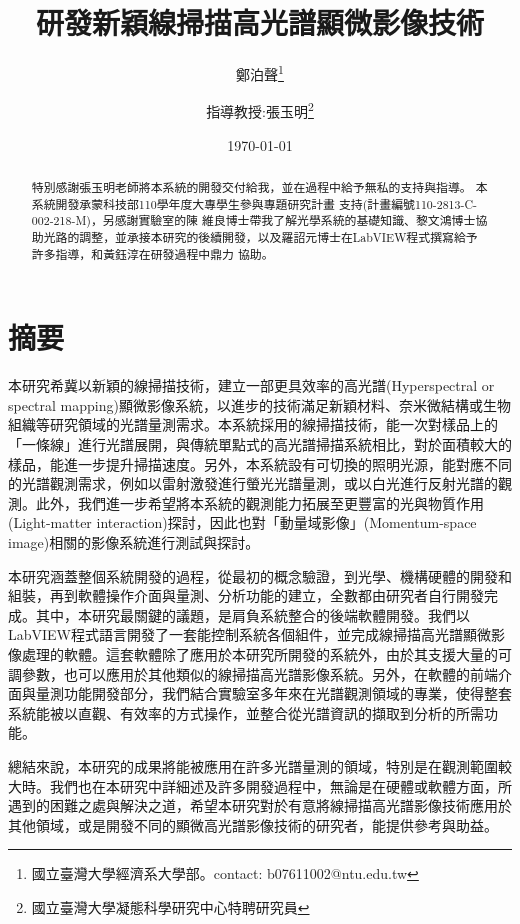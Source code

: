 \documentclass[12pt]{article}
\title{研發新穎線掃描高光譜顯微影像技術}
\author{鄭泊聲\thanks{國立臺灣大學經濟系大學部。contact: b07611002@ntu.edu.tw}
\and 指導教授:張玉明\thanks{國立臺灣大學凝態科學研究中心特聘研究員}}
\date{\today}
\begin{document}
\maketitle
{}
\begin{abstract}
    特別感謝張玉明老師將本系統的開發交付給我，並在過程中給予無私的支持與指導。
本系統開發承蒙科技部110學年度大專學生參與專題研究計畫
支持(計畫編號110-2813-C-002-218-M)，另感謝實驗室的陳
維良博士帶我了解光學系統的基礎知識、黎文鴻博士協助光路的調整，並承接本研究的後續開發，以及羅詔元博士在LabVIEW程式撰寫給予許多指導，和黃鈺淳在研發過程中鼎力
協助。
\end{abstract}

\newpage
\section*{摘要}
本研究希冀以新穎的線掃描技術，建立一部更具效率的高光譜(Hyperspectral or spectral mapping)顯微影像系統，以進步的技術滿足新穎材料、奈米微結構或生物組織等研究領域的光譜量測需求。本系統採用的線掃描技術，能一次對樣品上的「一條線」進行光譜展開，與傳統單點式的高光譜掃描系統相比，對於面積較大的樣品，能進一步提升掃描速度。另外，本系統設有可切換的照明光源，能對應不同的光譜觀測需求，例如以雷射激發進行螢光光譜量測，或以白光進行反射光譜的觀測。此外，我們進一步希望將本系統的觀測能力拓展至更豐富的光與物質作用(Light-matter interaction)探討，因此也對「動量域影像」(Momentum-space image)相關的影像系統進行測試與探討。

本研究涵蓋整個系統開發的過程，從最初的概念驗證，到光學、機構硬體的開發和組裝，再到軟體操作介面與量測、分析功能的建立，全數都由研究者自行開發完成。其中，本研究最關鍵的議題，是肩負系統整合的後端軟體開發。我們以LabVIEW程式語言開發了一套能控制系統各個組件，並完成線掃描高光譜顯微影像處理的軟體。這套軟體除了應用於本研究所開發的系統外，由於其支援大量的可調參數，也可以應用於其他類似的線掃描高光譜影像系統。另外，在軟體的前端介面與量測功能開發部分，我們結合實驗室多年來在光譜觀測領域的專業，使得整套系統能被以直觀、有效率的方式操作，並整合從光譜資訊的擷取到分析的所需功能。

總結來說，本研究的成果將能被應用在許多光譜量測的領域，特別是在觀測範圍較大時。我們也在本研究中詳細述及許多開發過程中，無論是在硬體或軟體方面，所遇到的困難之處與解決之道，希望本研究對於有意將線掃描高光譜影像技術應用於其他領域，或是開發不同的顯微高光譜影像技術的研究者，能提供參考與助益。

\noindent \textbf{}
\newpage
\end{document}
